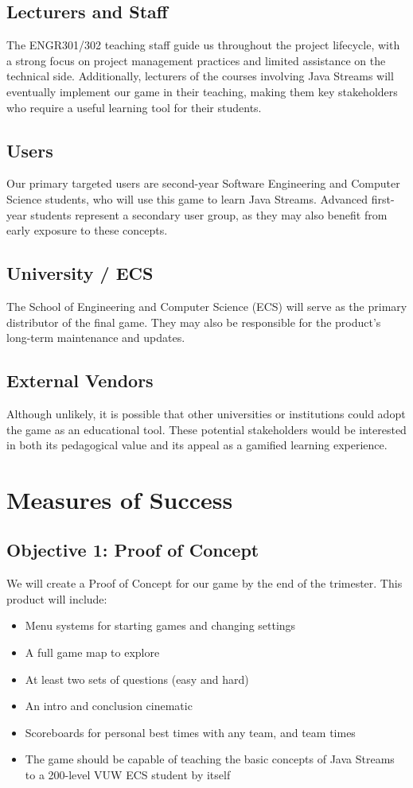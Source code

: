 \documentclass{article}
\begin{document}
\subsection*{Lecturers and Staff}
The ENGR301/302 teaching staff guide us throughout the project lifecycle, with a strong focus on project management practices and limited assistance on the technical side. Additionally, lecturers of the courses involving Java Streams will eventually implement our game in their teaching, making them key stakeholders who require a useful learning tool for their students.

\subsection*{Users}
Our primary targeted users are second-year Software Engineering and Computer Science students, who will use this game to learn Java Streams. Advanced first-year students represent a secondary user group, as they may also benefit from early exposure to these concepts.

\subsection*{University / ECS}
The School of Engineering and Computer Science (ECS) will serve as the primary distributor of the final game. They may also be responsible for the product’s long-term maintenance and updates.

\subsection*{External Vendors}
Although unlikely, it is possible that other universities or institutions could adopt the game as an educational tool. These potential stakeholders would be interested in both its pedagogical value and its appeal as a gamified learning experience.

\section{Measures of Success}

\subsection*{Objective 1: Proof of Concept}
We will create a Proof of Concept for our game by the end of the trimester. This product will include:
\begin{itemize}
    \item Menu systems for starting games and changing settings
    \item A full game map to explore
    \item At least two sets of questions (easy and hard)
    \item An intro and conclusion cinematic
    \item Scoreboards for personal best times with any team, and team times
    \item The game should be capable of  teaching the basic concepts of Java Streams to a 200-level VUW ECS student by itself
\end{itemize}
\end{document}
